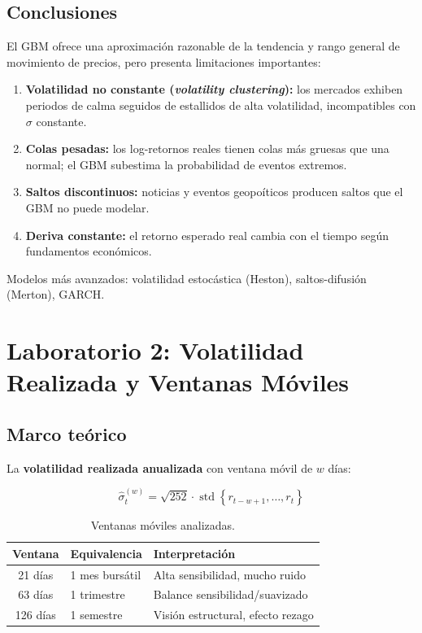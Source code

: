 \documentclass[12pt,letterpaper]{article}
\begin{document}
\subsection{Conclusiones}

El GBM ofrece una aproximaci\'on razonable de la tendencia y rango general de
movimiento de precios, pero presenta limitaciones importantes:

\begin{enumerate}
  \item \textbf{Volatilidad no constante (\textit{volatility clustering}):} los
    mercados exhiben periodos de calma seguidos de estallidos de alta volatilidad,
    incompatibles con $\sigma$ constante.
  \item \textbf{Colas pesadas:} los log-retornos reales tienen colas m\'as gruesas
    que una normal; el GBM subestima la probabilidad de eventos extremos.
  \item \textbf{Saltos discontinuos:} noticias y eventos geopo\'iticos producen
    saltos que el GBM no puede modelar.
  \item \textbf{Deriva constante:} el retorno esperado real cambia con el tiempo
    seg\'un fundamentos econ\'omicos.
\end{enumerate}

Modelos m\'as avanzados: volatilidad estoc\'astica (Heston), saltos-difusi\'on
(Merton), GARCH.

\section{Laboratorio 2: Volatilidad Realizada y Ventanas M\'oviles}

\subsection{Marco te\'orico}

La \textbf{volatilidad realizada anualizada} con ventana m\'ovil de $w$ d\'ias:

\begin{equation}
  \hat{\sigma}_t^{(w)} = \sqrt{252} \cdot
    \operatorname{std}\!\left\{r_{t-w+1}, \ldots, r_t\right\}
\end{equation}

\begin{table}[h!]
\centering
\begin{tabular}{@{}cll@{}}
\toprule
Ventana & Equivalencia & Interpretaci\'on \\
\midrule
21 d\'ias  & 1 mes burs\'atil    & Alta sensibilidad, mucho ruido \\
63 d\'ias  & 1 trimestre       & Balance sensibilidad/suavizado \\
126 d\'ias & 1 semestre        & Visi\'on estructural, efecto rezago \\
\bottomrule
\end{tabular}
\caption{Ventanas m\'oviles analizadas.}
\end{table}
\end{document}
